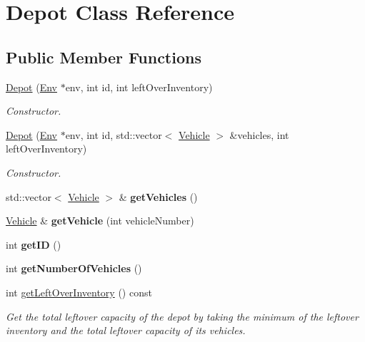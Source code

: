 \hypertarget{class_depot}{}\section{Depot Class Reference}
\label{class_depot}
\subsection*{Public Member Functions}
\begin{DoxyCompactItemize}
\item 
\hyperlink{class_depot_ae5be13d5305f06443d8941be30ca5e71}{Depot} (\hyperlink{class_env}{Env} $\ast$env, int id, int left\+Over\+Inventory)
\begin{DoxyCompactList}\small\item\em Constructor. \end{DoxyCompactList}\item 
\hyperlink{class_depot_a105364e1e00f7d359538838b2c1e81f6}{Depot} (\hyperlink{class_env}{Env} $\ast$env, int id, std\+::vector$<$ \hyperlink{class_vehicle}{Vehicle} $>$ \&vehicles, int left\+Over\+Inventory)
\begin{DoxyCompactList}\small\item\em Constructor. \end{DoxyCompactList}\item 
\mbox{\label{class_depot_a7ebccd66bec499d9dc7411dc78efc348}} 
std\+::vector$<$ \hyperlink{class_vehicle}{Vehicle} $>$ \& {\bfseries get\+Vehicles} ()
\item 
\mbox{\label{class_depot_afd012e808f49e162b9713b75fd43c604}} 
\hyperlink{class_vehicle}{Vehicle} \& {\bfseries get\+Vehicle} (int vehicle\+Number)
\item 
\mbox{\label{class_depot_a4c45e9fa5fca7ad3db018f20ae80d774}} 
int {\bfseries get\+ID} ()
\item 
\mbox{\label{class_depot_aa8fa0abff367255b9d908c4e8fb93227}} 
int {\bfseries get\+Number\+Of\+Vehicles} ()
\item 
int \hyperlink{class_depot_a443f83f05f5b5f939f5f7d67a615239a}{get\+Left\+Over\+Inventory} () const
\begin{DoxyCompactList}\small\item\em Get the total leftover capacity of the depot by taking the minimum of the leftover inventory and the total leftover capacity of its vehicles. \end{DoxyCompactList}\item 

\end{DoxyCompactItemize}
